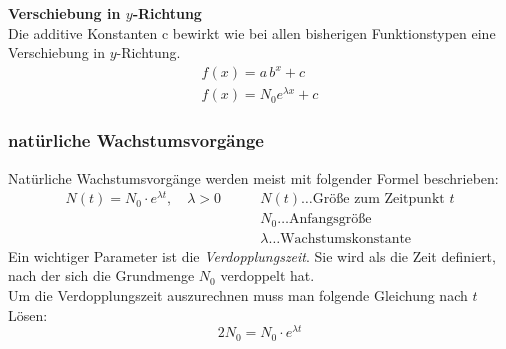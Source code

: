 \begin{minipage}[t]{0.48\textwidth}
{
    \textbf{Verschiebung in $y$‑Richtung}\\
    Die additive Konstanten c bewirkt wie bei allen bisherigen Funktionstypen eine Verschiebung in $y$-Richtung.\\
    \begin{align*}
      f(x) = a\, b^x + c \\
      f(x) = N_0 e^{\lambda x} + c
    \end{align*}
}
{
    \centering
}
\end{minipage}

\pagebreak

\subsubsection{natürliche Wachstumsvorgänge}
Natürliche Wachstumsvorgänge werden meist mit folgender Formel beschrieben:
\begin{align}
    N(t)=N_0 \cdot e^{\lambda t},\quad \lambda > 0 \qquad  &N(t) \dots \text{Größe zum Zeitpunkt } t \\
                                                           &N_0 \dots \text{Anfangsgröße} \nonumber \\
                                                           &\lambda \dots \text{Wachstumskonstante} \nonumber
\end{align}
Ein wichtiger Parameter ist die \emph{Verdopplungszeit}. Sie wird als die Zeit definiert, nach der sich die Grundmenge $N_0$ verdoppelt hat.\\
Um die Verdopplungszeit auszurechnen muss man folgende Gleichung nach $t$ Lösen:
\begin{equation}
    2 N_0 = N_0 \cdot e^{\lambda t}
\end{equation}

